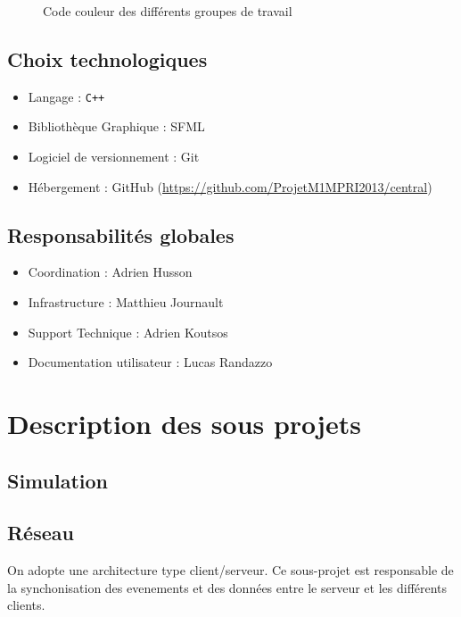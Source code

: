 \documentclass[a4paper,10pt]{article}
\begin{document}
\begin{figure}[h]
\centering
{}
 \caption{Code couleur des différents groupes de travail}
\end{figure}
\subsection{Choix technologiques}
\begin{itemize}
 \item Langage : \verb!C++!
 \item Bibliothèque Graphique : SFML
 \item Logiciel de versionnement : Git
 \item Hébergement : GitHub (\href{https://github.com/ProjetM1MPRI2013/central}{https://github.com/ProjetM1MPRI2013/central})
\end{itemize}
\subsection{Responsabilités globales}
\begin{itemize}
 \item Coordination : Adrien Husson
 \item Infrastructure : Matthieu Journault
 \item Support Technique : Adrien Koutsos
 \item Documentation utilisateur : Lucas Randazzo
\end{itemize}

\section{Description des sous projets}
\subsection{Simulation}
\subsection{Réseau}
On adopte une architecture type client/serveur. Ce sous-projet est responsable de la synchonisation des evenements et des données entre le serveur et les différents clients.
\end{document}
